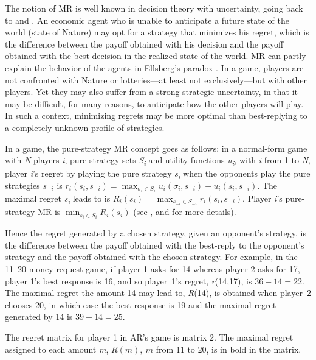 \begin{Article}
\begin{refsection}[Umbhauer]
The notion of MR is well known in decision theory with uncertainty,
going back to \textcite{savage1951} and \textcite{niehans1948}. An economic
agent who is unable to anticipate a future state of the world (state of
Nature) may opt for a strategy that minimizes his regret, which is the
difference between the payoff obtained with his decision and the payoff
obtained with the best decision in the realized state of the world. MR
can partly explain the behavior of the agents in Ellsberg's paradox
\parencite{ellsberg1961}. In a game, players are not confronted with Nature or
lotteries---at least not exclusively---but with other players. Yet they
may also suffer from a strong strategic uncertainty, in that it may be
difficult, for many reasons, to anticipate how the other players will
play. In such a context, minimizing regrets may be more optimal than
best-replying to a completely unknown profile of strategies.

In a game, the pure-strategy MR concept goes as follows: in a
normal-form game with \emph{N} players \emph{i}, pure strategy sets
\emph{S\textsubscript{i}} and utility functions
\emph{u\textsubscript{i}}, with \emph{i} from 1 to \emph{N}, player
\emph{i}'s regret by playing the pure strategy \(s_{i}\ \)when the
opponents play the pure strategies \(s_{- i}\) is
\(r_{i}(s_{i}, s_{- i}) = \max_{\sigma_{i} \in S_{i}}{u_{i}\left( \sigma_{i}, s_{- i} \right) - u_{i}\left( s_{i}, s_{- i} \right)}\).
The maximal regret \emph{s\textsubscript{i}} leads to is
\(R_{i}\left( s_{i} \right) = \max_{s_{- i} \in S_{- i}}{r_{i}(s_{i}, s_{- i})}\).
Player \emph{i}'s pure-strategy MR is
\(\min_{s_{i} \in S_{i}}{R_{i}\left( s_{i} \right)}\) (see \textcite{linhart1989}, \textcite{halpern2012} and \textcite{renou2010} for more details).

Hence the regret generated by a chosen strategy, given an opponent's
strategy, is the difference between the payoff obtained with the
best-reply to the opponent's strategy and the payoff obtained with the
chosen strategy. For example, in the 11--20 money request game, if
player 1 asks for 14 whereas player 2 asks for 17, player 1's best
response is 16, and so player~1's regret, \emph{r}(14,17), is
$36-14=22$. The maximal regret the amount 14 may lead to,
\emph{R}(14), is obtained when player~2 chooses 20, in which case the
best response is 19 and the maximal regret generated by 14 is $39-14=25$.

The regret matrix for player 1 in AR's game is matrix 2. The maximal
regret assigned to each amount \emph{m}, \(R(m),\ m\) from 11 to 20, is
in bold in the matrix.


\end{refsection}
\end{Article}
